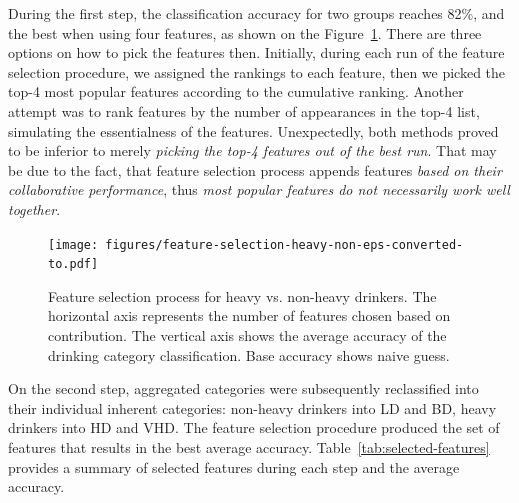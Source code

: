 	During the first step, the classification accuracy for two groups reaches 82\%, and the best when using four features, as shown on the Figure~\ref{fig:forward-selection-combined}. There are three options on how to pick the features then. Initially, during each run of the feature selection procedure, we assigned the rankings to each feature, then we picked the top-4 most popular features according to the cumulative ranking. Another attempt was to rank features by the number of appearances in the top-4 list, simulating the essentialness of the features. Unexpectedly, both methods proved to be inferior to merely \textit{picking the top-4 features out of the best run}. That may be due to the fact, that feature selection process appends features \textit{based on their collaborative performance}, thus \textit{most popular features do not necessarily work well together}. 
	
	\begin{figure}[ht]
		\centering
		\texttt{[image: figures/feature-selection-heavy-non-eps-converted-to.pdf]}
		\caption{Feature selection process for heavy vs. non-heavy drinkers.  The horizontal axis represents the number of features chosen based on contribution. The vertical axis shows the average accuracy of the drinking category classification. Base accuracy shows naive guess.}
		\label{fig:forward-selection-combined}
	\end{figure}
	
	On the second step, aggregated categories were subsequently reclassified into their individual inherent categories: non-heavy drinkers into LD and BD, heavy drinkers into HD and VHD. The feature selection procedure produced the set of features that results in the best average accuracy. Table~\ref{tab:selected-features} provides a summary of selected features during each step and the average accuracy.
	
